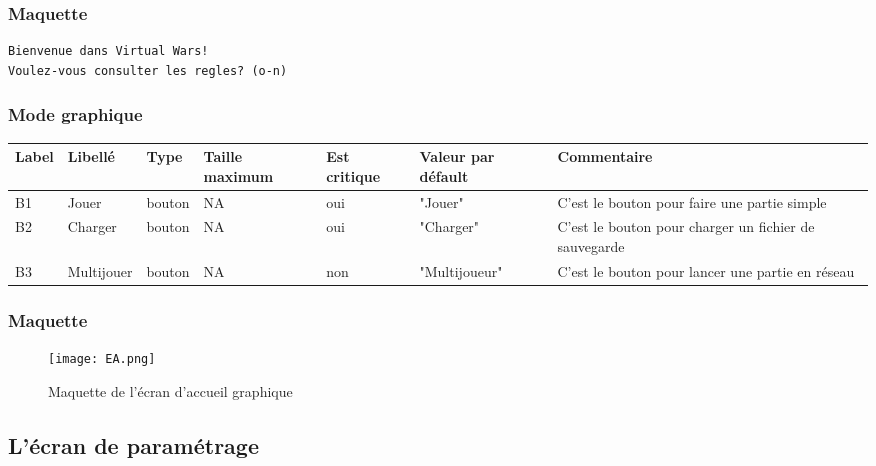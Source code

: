 \documentclass[12pt,a4paper]{article}
\begin{document}
\begin{itemize}
				\subsubsection*{Maquette}
					\begin{lstlisting}
Bienvenue dans Virtual Wars!
Voulez-vous consulter les regles? (o-n)
					\end{lstlisting}

			\subsubsection{Mode graphique}
				\hspace{-3cm}
					\begin{tabular}{|p{1cm}|p{2.5cm}|p{1.5cm}|p{3cm}|p{2.5cm}|p{2.5cm}|p{3cm}|} %
						\hline
							Label & Libellé & Type & Taille maximum & Est critique & Valeur par défault & Commentaire \\
						\hline \hline
							B1 & Jouer & bouton & NA & oui & "Jouer" & C'est le bouton pour faire une partie simple \\
							\hline
							B2 & Charger & bouton & NA & oui & "Charger" & C'est le bouton pour charger un fichier de sauvegarde \\
							\hline
							B3 & Multijouer & bouton & NA & non & "Multijoueur" & C'est le bouton pour lancer une partie en réseau \\
							\hline
					\end{tabular}
					\label{Information présente sur l'écran d'accueil graphique}
				\newpage
				\subsubsection*{Maquette}
					\begin{figure}[!h]
						\texttt{[image: EA.png]}
						\caption{Maquette de l'écran d'accueil graphique}
						\label{Maquette de l'écran d'accueil graphique}
					\end{figure}


		\subsection{L'écran de paramétrage}

\end{itemize}
\end{document}
